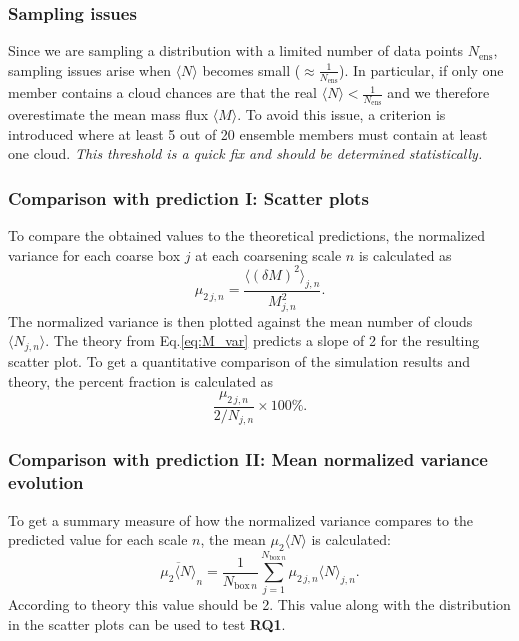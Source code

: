 \documentclass[a4paper, 12pt, draft]{article}
\begin{document}
\subsubsection{Sampling issues}
Since we are sampling a distribution with a limited number of data points $N_{\mathrm{ens}}$, sampling issues arise when $\langle N \rangle$ becomes small ($\approx \frac{1}{N_{\mathrm{ens}}}$). In particular, if only one member contains a cloud chances are that the real $\langle N \rangle < \frac{1}{N_{\mathrm{ens}}}$ and we therefore overestimate the mean mass flux $\langle M \rangle$. To avoid this issue, a criterion is introduced where at least 5 out of 20 ensemble members must contain at least one cloud. \textit{This threshold is a quick fix and should be determined statistically.}

\subsubsection{Comparison with prediction I: Scatter plots}
To compare the obtained values to the theoretical predictions, the normalized variance for each coarse box $j$ at each coarsening scale $n$ is calculated as 
\begin{equation} \label{eq:normalized_variance}
 \mu_{2\,j, n} = \frac{\langle (\delta M )^2 \rangle_{j,n}}{M_{j,n}^2}.
\end{equation}
The normalized variance is then plotted against the mean number of clouds $\langle N_{j,n} \rangle$. The theory from Eq.\ref{eq:M_var} predicts a slope of 2 for the resulting scatter plot. To get a quantitative comparison of the simulation results and theory, the percent fraction is calculated as
\begin{equation} \label{eq:normalized_variance_percent}
 \frac{\mu_{2\,j, n}}{2 / N_{j,n}}\times 100\%.
\end{equation}

\subsubsection{Comparison with prediction II: Mean normalized variance evolution}
To get a summary measure of how the normalized variance compares to the predicted value for each scale $n$, the mean $\mu_{2} \langle N \rangle$ is calculated:
\begin{equation} \label{eq:mean_nvar_n}
 \overline{\mu_{2}\langle N \rangle}_n = \frac{1}{N_{\mathrm{box}\,n}} \sum_{j=1}^{N_{\mathrm{box}\,n}} \mu_{2\,j,n}\langle N \rangle_{j,n}.
\end{equation}
According to theory this value should be 2. This value along with the distribution in the scatter plots can be used to test \textbf{RQ1}. 
\end{document}
